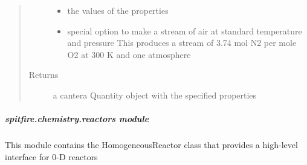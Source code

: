 \documentclass[letterpaper,10pt,english]{sphinxmanual}
\begin{document}
\begin{fulllineitems}
\begin{fulllineitems}
\begin{quote}
\begin{description}
\begin{itemize}
\item {} 
 \textendash{} the values of the properties

\item {} 
 \textendash{} special option to make a stream of air at standard temperature and pressure
This produces a stream of 3.74 mol N2 per mole O2 at 300 K and one atmosphere

\end{itemize}

\item[{Returns}] \leavevmode
a cantera Quantity object with the specified properties

\end{description}\end{quote}

\end{fulllineitems}


\end{fulllineitems}



\subparagraph{spitfire.chemistry.reactors module}
\label{\detokenize{spitfire.chemistry.reactors:module-spitfire.chemistry.reactors}}\label{\detokenize{spitfire.chemistry.reactors:spitfire-chemistry-reactors-module}}\label{\detokenize{spitfire.chemistry.reactors::doc}}
This module contains the HomogeneousReactor class that provides a high-level interface for 0-D reactors
\end{document}
